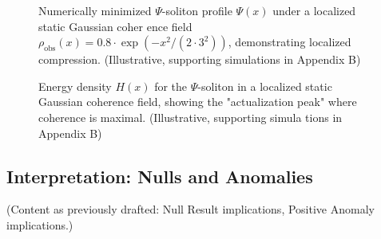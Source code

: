 \documentclass{report}
\begin{document}
    \begin{figure}[h!]
    \centering
    \caption{Numerically minimized $\Psi$-soliton profile $\Psi(x)$ under a localized static Gaussian coher ence field $\rho_{\text{obs}}(x) = 0.8 \cdot \exp(-x^2/(2 \cdot 3^2))$, demonstrating localized compression. (Illustrative, supporting simulations in Appendix B)}
    \label{fig:soliton_profile_gaussian}
    \end{figure}

    \begin{figure}[h!]
    \centering
    \caption{Energy density $H(x)$ for the $\Psi$-soliton in a localized static Gaussian coherence field, showing the "actualization peak" where coherence is maximal. (Illustrative, supporting simula tions in Appendix B)}
    \label{fig:energy_density_gaussian}
    \end{figure}


    \subsection{Interpretation: Nulls and Anomalies}
    \label{subsec:interpretation_nulls_anomalies}
    (Content as previously drafted: Null Result implications, Positive Anomaly implications.)

\end{document}

